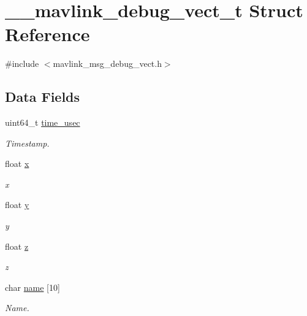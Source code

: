 \hypertarget{struct____mavlink__debug__vect__t}{\section{\+\_\+\+\_\+mavlink\+\_\+debug\+\_\+vect\+\_\+t Struct Reference}
\label{struct____mavlink__debug__vect__t}
}


{\ttfamily \#include $<$mavlink\+\_\+msg\+\_\+debug\+\_\+vect.\+h$>$}

\subsection*{Data Fields}
\begin{DoxyCompactItemize}
\item 
uint64\+\_\+t \hyperlink{struct____mavlink__debug__vect__t_a8ce7a8e6e061bff40d49ca81fdd3ce33}{time\+\_\+usec}
\begin{DoxyCompactList}\small\item\em Timestamp. \end{DoxyCompactList}\item 
float \hyperlink{struct____mavlink__debug__vect__t_a9a222c84369ea74593be0625abb29bc8}{x}
\begin{DoxyCompactList}\small\item\em x \end{DoxyCompactList}\item 
float \hyperlink{struct____mavlink__debug__vect__t_a400c1d51e5edb6686737999ae6e4aba7}{y}
\begin{DoxyCompactList}\small\item\em y \end{DoxyCompactList}\item 
float \hyperlink{struct____mavlink__debug__vect__t_a8fdd83fc7a64d6a8200dea9dddf58ee9}{z}
\begin{DoxyCompactList}\small\item\em z \end{DoxyCompactList}\item 
char \hyperlink{struct____mavlink__debug__vect__t_a8547179b8e8db0e26704d23b474d5f0a}{name} \mbox{[}10\mbox{]}
\begin{DoxyCompactList}\small\item\em Name. \end{DoxyCompactList}\end{DoxyCompactItemize}


